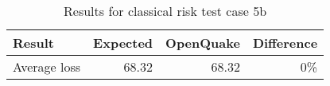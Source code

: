 \begin{table}[htbp]

\centering
\begin{tabular}{ l r r r }

\hline
\rowcolor{anti-flashwhite}
\bf{Result} & \bf{Expected} & \bf{OpenQuake} & \bf{Difference}\\
\hline
Average loss & 68.32 & 68.32 & 0\% \\
\hline
\end{tabular}

\caption{Results for classical risk test case 5b}
\label{tab:result-classical-risk-5b}
\end{table}